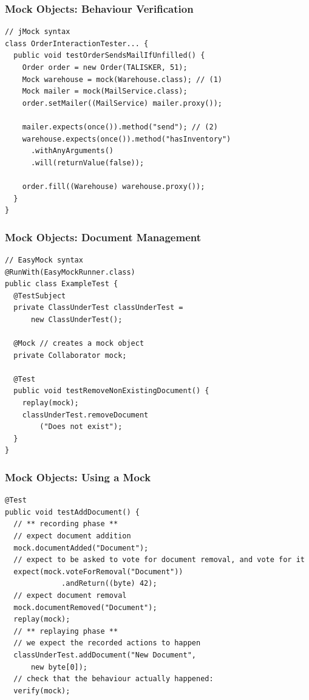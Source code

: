 \documentclass{beamer}
\newenvironment{changemargin}[1]{%
  \begin{list}{}{%
    \setlength{\topsep}{0pt}%
    \setlength{\leftmargin}{#1}%
    \setlength{\rightmargin}{1em}
    \setlength{\listparindent}{\parindent}%
    \setlength{\itemindent}{\parindent}%
    \setlength{\parsep}{\parskip}%
  }%
  \item[]}{\end{list}}
\begin{document}
\begin{frame}[fragile]
  \frametitle{Mock Objects: Behaviour Verification}
  \begin{changemargin}{1cm}
{\small
  \begin{lstlisting}
// jMock syntax
class OrderInteractionTester... {
  public void testOrderSendsMailIfUnfilled() {
    Order order = new Order(TALISKER, 51);
    Mock warehouse = mock(Warehouse.class); // (1)
    Mock mailer = mock(MailService.class);
    order.setMailer((MailService) mailer.proxy());

    mailer.expects(once()).method("send"); // (2)
    warehouse.expects(once()).method("hasInventory")
      .withAnyArguments()
      .will(returnValue(false));

    order.fill((Warehouse) warehouse.proxy());
  }
}    
\end{lstlisting}
}
  \end{changemargin}
\end{frame}

\begin{frame}[fragile]
  \frametitle{Mock Objects: Document Management}
  \begin{changemargin}{1cm}
{\small
  \begin{lstlisting}
// EasyMock syntax
@RunWith(EasyMockRunner.class)
public class ExampleTest {
  @TestSubject
  private ClassUnderTest classUnderTest =
      new ClassUnderTest();

  @Mock // creates a mock object
  private Collaborator mock;

  @Test
  public void testRemoveNonExistingDocument() {
    replay(mock);
    classUnderTest.removeDocument
        ("Does not exist");
  }
} 
\end{lstlisting}
}
  \end{changemargin}
\end{frame}

\begin{frame}[fragile]
  \frametitle{Mock Objects: Using a Mock}
  \begin{changemargin}{1cm}
{\small
  \begin{lstlisting}
@Test
public void testAddDocument() {
  // ** recording phase **
  // expect document addition
  mock.documentAdded("Document");
  // expect to be asked to vote for document removal, and vote for it
  expect(mock.voteForRemoval("Document"))
             .andReturn((byte) 42);
  // expect document removal
  mock.documentRemoved("Document");
  replay(mock);
  // ** replaying phase **
  // we expect the recorded actions to happen
  classUnderTest.addDocument("New Document",
      new byte[0]);
  // check that the behaviour actually happened:
  verify(mock);
  \end{lstlisting}
}
  \end{changemargin}
\end{frame}
\end{document}
